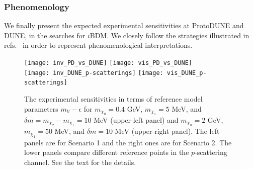 \subsubsection{Phenomenology}\label{Sec:Pheno}

We finally present the expected experimental sensitivities at ProtoDUNE and DUNE, in the searches for $i$BDM.
We closely follow the strategies illustrated in refs.~\cite{Giudice:2017zke, Chatterjee:2018mej, Kim:2018veo} in order to represent phenomenological interpretations. 

\begin{figure}[t]
\centering
\texttt{[image: inv\_PD\_vs\_DUNE]} 
\texttt{[image: vis\_PD\_vs\_DUNE]} \\
\vspace{0.3cm}
\texttt{[image: inv\_DUNE\_p-scatterings]}
\texttt{[image: vis\_DUNE\_p-scatterings]}
\caption{
The experimental sensitivities in terms of reference model parameters $m_V - \epsilon$ 
for $m_{\chi_0} = 0.4$ GeV, $m_{\chi_1} = 5$ MeV, and $\delta m = m_{\chi_2} - m_{\chi_1} = 10$ MeV (upper-left panel) and $m_{\chi_0} = 2$ GeV, $m_{\chi_1} = 50$ MeV, and $\delta m = 10$ MeV (upper-right panel).
The left panels are for Scenario 1 and the right ones are for Scenario 2.
The lower panels compare different reference points in the $p$-scattering channel.
See the text for the details.
\label{fig:darkphotonparameter} }
\end{figure}


